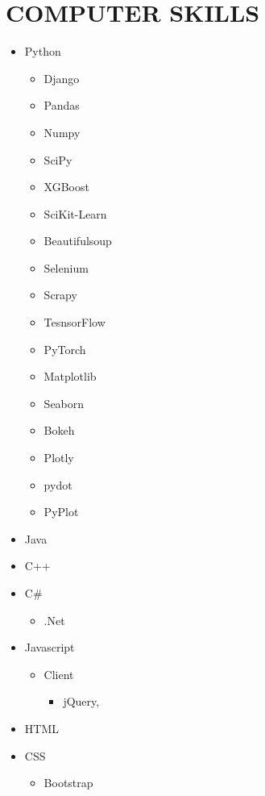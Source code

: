 \documentclass[10pt,a4paper,sans]{moderncv} %
\begin{document}
	
		
	\section{COMPUTER SKILLS}
	
	\begin{cvcolumns}
		{
			\begin{itemize}
				\item Python
				\begin{itemize}
					\item Django
					\item Pandas
					\item Numpy
					\item SciPy
					\item XGBoost
					\item SciKit-Learn
					\item Beautifulsoup
					\item Selenium
					\item Scrapy
					\item TesnsorFlow
					\item PyTorch
					\item Matplotlib
					\item Seaborn
					\item Bokeh
					\item Plotly
		            \item pydot
					\item PyPlot
				\end{itemize}
				\item Java
				\item C++
				\item C\#
				\begin{itemize}
					\item .Net
				\end{itemize}
				\item Javascript
				\begin{itemize}
					\item Client
					\begin{itemize}
						\item jQuery,
					\end{itemize}
				\end{itemize}
				\item HTML
				\item CSS
				\begin{itemize}
					\item Bootstrap
				\end{itemize}
			\end{itemize}
		}
		

\end{cvcolumns}
\end{document}
